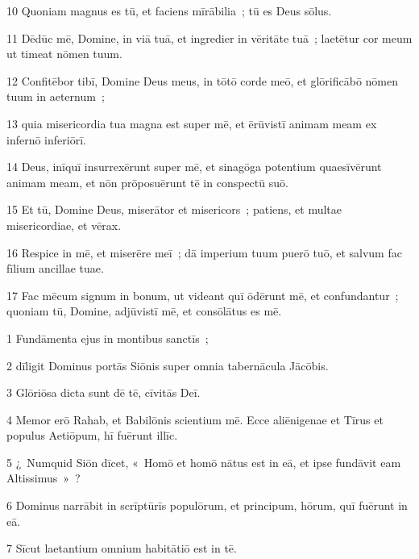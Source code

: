 \psalmVerse
  {\phantom{0}10}
  {Quoniam magnus es tū, et faciens mīrābilia~; tū es Deus sōlus.}


\psalmVerse
  {\phantom{0}11}
  {Dēdūc mē, Domine, in viā tuā, et ingredier in vēritāte tuā~; laetētur cor meum ut timeat nōmen tuum.}


\psalmVerse
  {\phantom{0}12}
  {Confitēbor tibī, Domine Deus meus, in tōtō corde meō, et glōrificābō nōmen tuum in aeternum~;}


\psalmVerse
  {\phantom{0}13}
  {quia misericordia tua magna est super mē, et ērūvistī animam meam ex infernō inferiōrī.}


\psalmVerse
  {\phantom{0}14}
  {Deus, inīquī insurrexērunt super mē, et sinagōga potentium quaesīvērunt animam meam, et nōn prōposuērunt tē in conspectū suō.}


\psalmVerse
  {\phantom{0}15}
  {Et tū, Domine Deus, miserātor et misericors~; patiens, et multae misericordiae, et vērax.}


\psalmVerse
  {\phantom{0}16}
  {Respice in mē, et miserēre meī~; dā imperium tuum puerō tuō, et salvum fac fīlium ancillae tuae.}


\psalmVerse
  {\phantom{0}17}
  {Fac mēcum signum in bonum, ut videant quī ōdērunt mē, et confundantur~; quoniam tū, Domine, adjūvistī mē, et consōlātus es mē.}



\psalmVerse
  {\phantom{00}1}
  {Fundāmenta ejus in montibus sanctīs~;}


\psalmVerse
  {\phantom{00}2}
  {dīligit Dominus portās Siōnis super omnia tabernācula Jācōbis.}


\psalmVerse
  {\phantom{00}3}
  {Glōriōsa dicta sunt dē tē, cīvitās Deī.}


\psalmVerse
  {\phantom{00}4}
  {Memor erō Rahab, et Babilōnis scientium mē. Ecce aliēnigenae et Tīrus et populus Aetiōpum, hī fuērunt illīc.}


\psalmVerse
  {\phantom{00}5}
  {¿~Numquid Siōn dīcet, «~Homō et homō nātus est in eā, et ipse fundāvit eam Altissimus~»~?}


\psalmVerse
  {\phantom{00}6}
  {Dominus narrābit in scrīptūrīs populōrum, et principum, hōrum, quī fuērunt in eā.}


\psalmVerse
  {\phantom{00}7}
  {Sīcut laetantium omnium habitātiō est in tē.}



